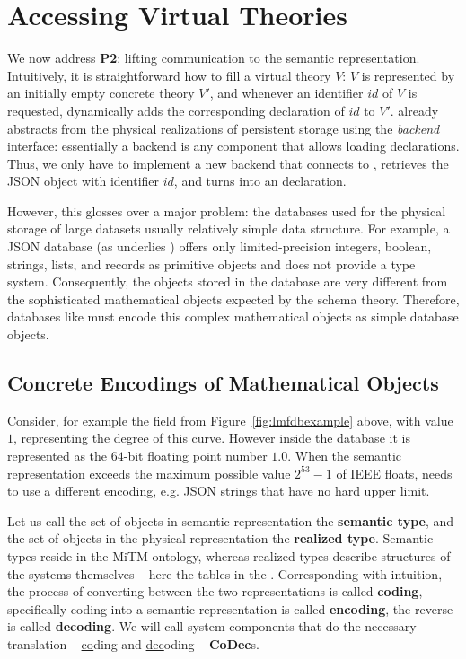 \section{Accessing Virtual Theories}\label{sec:access}

We now address \textbf{P2}: lifting communication to the semantic representation.
Intuitively, it is straightforward how to fill a virtual theory $V$: $V$ is represented by an initially empty concrete theory $V'$, and whenever an identifier $id$ of $V$ is requested, \mmt dynamically adds the corresponding declaration of $id$ to $V'$.
\mmt already abstracts from the physical realizations of persistent storage using the \emph{backend} interface: essentially a backend is any component that allows loading declarations.
Thus, we only have to implement a new backend that connects to \lmfdb, retrieves the JSON object with identifier $id$, and turns into an \ommt declaration.

However, this glosses over a major problem: the databases used for the physical storage of large datasets usually relatively simple data structure.
For example, a JSON database (as underlies \lmfdb) offers only limited-precision integers, boolean, strings, lists, and records as primitive objects and does not provide a type system.
Consequently, the objects stored in the database are very different from the sophisticated mathematical objects expected by the schema theory.
Therefore, databases like \lmfdb must encode this complex mathematical objects as simple database objects.

\subsection{Concrete Encodings of Mathematical Objects}\label{sec:vt:translation}

Consider, for example the  field from Figure~\ref{fig:lmfdbexample} above, with value $1$, representing the degree of this curve. 
However inside the database it is represented as the  $64$-bit floating point number $1.0$. 
When the semantic representation exceeds the maximum possible value $2^{53}-1$ of IEEE floats, \lmfdb needs to use a different encoding, e.g. JSON strings that have no hard upper limit.

Let us call the set of objects in semantic representation the \textbf{semantic type}, and the set of objects in the physical representation the \textbf{realized type}. 
Semantic types reside in the MiTM ontology, whereas realized types describe structures of the systems themselves -- here the tables in the \lmfdb. 
Corresponding with intuition, the process of converting between the two representations is called \textbf{coding}, specifically coding into a semantic representation is called \textbf{encoding}, the reverse is called \textbf{decoding}. 
We will call system components that do the necessary translation -- \underline{co}ding and \underline{dec}oding -- \textbf{CoDec}s. 

